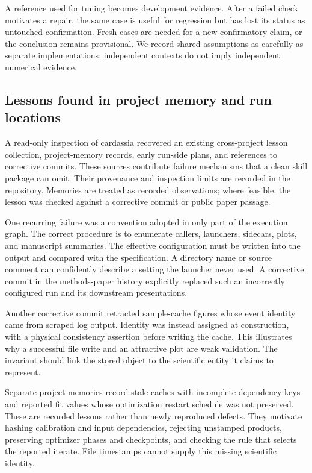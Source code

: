 \documentclass{article}
\begin{document}
A reference used for tuning becomes development evidence. After a failed check motivates a repair, the same case is useful for regression but has lost its status as untouched confirmation. Fresh cases are needed for a new confirmatory claim, or the conclusion remains provisional. We record shared assumptions as carefully as separate implementations: independent contexts do not imply independent numerical evidence.

\subsection{Lessons found in project memory and run locations}
A read-only inspection of cardassia recovered an existing cross-project lesson collection, project-memory records, early run-side plans, and references to corrective commits. These sources contribute failure mechanisms that a clean skill package can omit. Their provenance and inspection limits are recorded in the repository. Memories are treated as recorded observations; where feasible, the lesson was checked against a corrective commit or public paper passage.

One recurring failure was a convention adopted in only part of the execution graph. The correct procedure is to enumerate callers, launchers, sidecars, plots, and manuscript summaries. The effective configuration must be written into the output and compared with the specification. A directory name or source comment can confidently describe a setting the launcher never used. A corrective commit in the methods-paper history explicitly replaced such an incorrectly configured run and its downstream presentations.

Another corrective commit retracted sample-cache figures whose event identity came from scraped log output. Identity was instead assigned at construction, with a physical consistency assertion before writing the cache. This illustrates why a successful file write and an attractive plot are weak validation. The invariant should link the stored object to the scientific entity it claims to represent.

Separate project memories record stale caches with incomplete dependency keys and reported fit values whose optimization restart schedule was not preserved. These are recorded lessons rather than newly reproduced defects. They motivate hashing calibration and input dependencies, rejecting unstamped products, preserving optimizer phases and checkpoints, and checking the rule that selects the reported iterate. File timestamps cannot supply this missing scientific identity.
\end{document}

